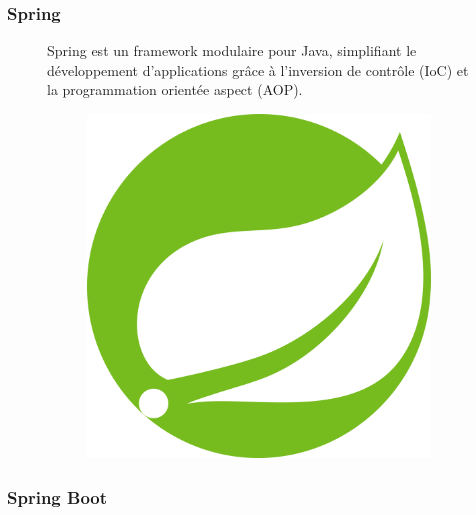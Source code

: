\documentclass[12pt,a4paper]{report}
\begin{document}
	\subsubsection{Spring}
	
	\begin{figure}[H]
		\begin{minipage}{0.8\textwidth}
			Spring est un framework modulaire pour Java, simplifiant le développement d'applications grâce à l’inversion de contrôle (IoC) et la programmation orientée aspect (AOP).
		\end{minipage}
		\hfill
		\begin{minipage}{0.15\textwidth} 
			\begin{figure}[H]
				\centering
				\includegraphics[width=\linewidth]{spring-logo.png}
				\label{fig:spring-logo}
			\end{figure}
		\end{minipage}
	\end{figure}
	
	\subsubsection{Spring Boot}
	
\end{document}
